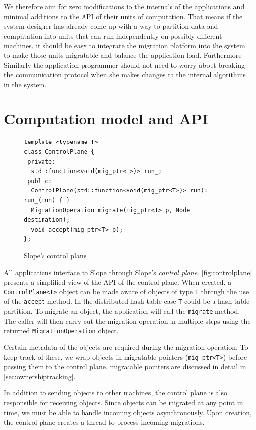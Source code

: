 We therefore aim for zero modifications to the
internals of the applications and minimal additions to the API of their
units of computation. That means if the system designer has already come up
with a way to partition data and computation into units that can run
independently on possibly different machines, it should be easy to
integrate the migration platform into the system to make those units
migratable and balance the application load. Furthermore Similarly the
application programmer should not need to worry about breaking the communication
protocol when she makes changes to the internal algorithms in the system.

\section{Computation model and API}
\label{sec:api}

\begin{figure}[t]
\begin{lstlisting}
template <typename T>
class ControlPlane {
 private:
  std::function<void(mig_ptr<T>)> run_;
 public:
  ControlPlane(std::function<void(mig_ptr<T>)> run): run_(run) { }
  MigrationOperation migrate(mig_ptr<T> p, Node destination);
  void accept(mig_ptr<T> p);
};
\end{lstlisting}
\caption{
    Slope's control plane
}
\label{fig:controlplane}
\end{figure}

All applications interface to Slope through Slope's \emph{control plane}.
\autoref{fig:controlplane} presents a simplified view of the API of the
control plane. When created, a \texttt{ControlPlane<T>} object can be
made aware of objects of type \texttt{T} through the use of the \texttt{accept}
method. In the distributed hash table case \texttt{T} could be a hash table
partition. To migrate an object, the application will call the \texttt{migrate}
method. The caller will then carry out the migration operation in multiple
steps using the returned \texttt{MigrationOperation} object.

Certain metadata of the objects are required during the migration
operation. To keep track of these, we wrap objects in
migratable pointers (\texttt{mig\_ptr<T>}) before passing them to the control
plane. migratable pointers are discussed in detail in \autoref{sec:ownershiptracking}.

In addition to sending objects to other machines, the control plane is also
responsible for receiving objects. Since objects can be migrated at any point
in time, we must be able to handle incoming objects asynchronously. Upon
creation, the control plane creates a thread to process incoming migrations.

